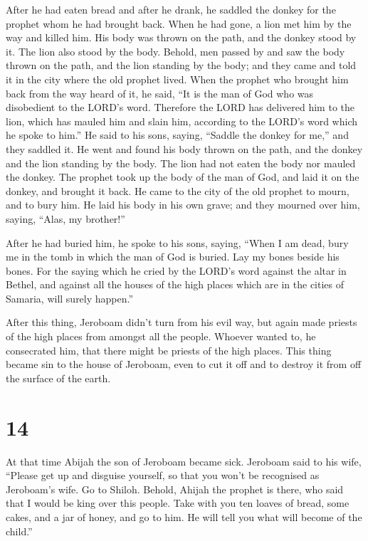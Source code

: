  After he had eaten bread and after he drank, he saddled
the donkey for the prophet whom he had brought back. 
When he had gone, a lion met him by the way and killed him. His body was
thrown on the path, and the donkey stood by it. The lion also stood by
the body.  Behold, men passed by and saw the body thrown
on the path, and the lion standing by the body; and they came and told
it in the city where the old prophet lived.  When the
prophet who brought him back from the way heard of it, he said, ``It is
the man of God who was disobedient to the LORD's word. Therefore the
LORD has delivered him to the lion, which has mauled him and slain him,
according to the LORD's word which he spoke to him.''  He
said to his sons, saying, ``Saddle the donkey for me,'' and they saddled
it.  He went and found his body thrown on the path, and
the donkey and the lion standing by the body. The lion had not eaten the
body nor mauled the donkey.  The prophet took up the body
of the man of God, and laid it on the donkey, and brought it back. He
came to the city of the old prophet to mourn, and to bury him.
 He laid his body in his own grave; and they mourned over
him, saying, ``Alas, my brother!''

 After he had buried him, he spoke to his sons, saying,
``When I am dead, bury me in the tomb in which the man of God is buried.
Lay my bones beside his bones.  For the saying which he
cried by the LORD's word against the altar in Bethel, and against all
the houses of the high places which are in the cities of Samaria, will
surely happen.''

 After this thing, Jeroboam didn't turn from his evil
way, but again made priests of the high places from amongst all the
people. Whoever wanted to, he consecrated him, that there might be
priests of the high places.  This thing became sin to the
house of Jeroboam, even to cut it off and to destroy it from off the
surface of the earth.

\hypertarget{section-13}{%
\section{14}\label{section-13}}

 At that time Abijah the son of Jeroboam became sick.
 Jeroboam said to his wife, ``Please get up and disguise
yourself, so that you won't be recognised as Jeroboam's wife. Go to
Shiloh. Behold, Ahijah the prophet is there, who said that I would be
king over this people.  Take with you ten loaves of bread,
some cakes, and a jar of honey, and go to him. He will tell you what
will become of the child.''

